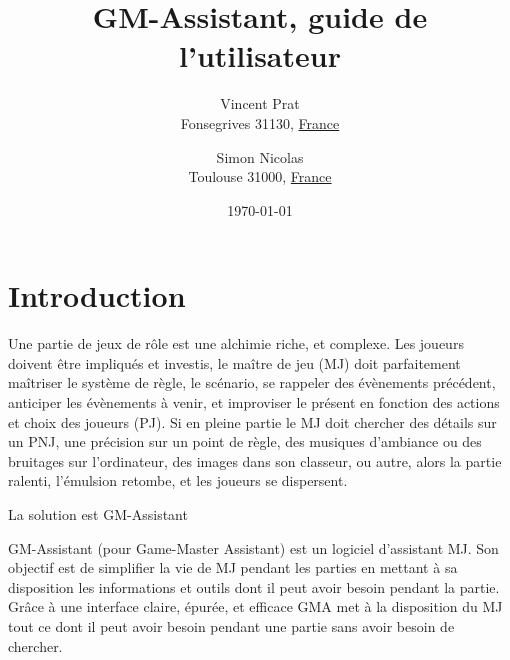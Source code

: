 \documentclass[12pt]{article}
\title{GM-Assistant, guide de l'utilisateur}
\author{
        Vincent Prat \\
                Fonsegrives 31130, \underline{France}
            \and
        Simon Nicolas\\
        Toulouse 31000, \underline{France}
}
\date{\today}
\begin{document}
\maketitle


\section{Introduction}
Une partie de jeux de rôle est une alchimie riche, et complexe. Les joueurs doivent être impliqués et investis, le maître de jeu (MJ) doit parfaitement maîtriser le système de règle, le scénario, se rappeler des évènements précédent, anticiper les évènements à venir, et improviser le présent en fonction des actions et choix des joueurs (PJ).
Si en pleine partie le MJ doit chercher des détails sur un PNJ, une précision sur un point de règle, des musiques d'ambiance ou des bruitages sur l'ordinateur, des images dans son classeur, ou autre, alors la partie ralenti, l'émulsion retombe, et les joueurs se dispersent.

La solution est GM-Assistant

GM-Assistant (pour Game-Master Assistant) est un logiciel d'assistant MJ. Son objectif est de simplifier la vie de MJ pendant les parties en mettant à sa disposition les informations et outils dont il peut avoir besoin pendant la partie.
Grâce à une interface claire, épurée, et efficace GMA met à la disposition du MJ tout ce dont il peut avoir besoin pendant une partie sans avoir besoin de chercher.
\end{document}
